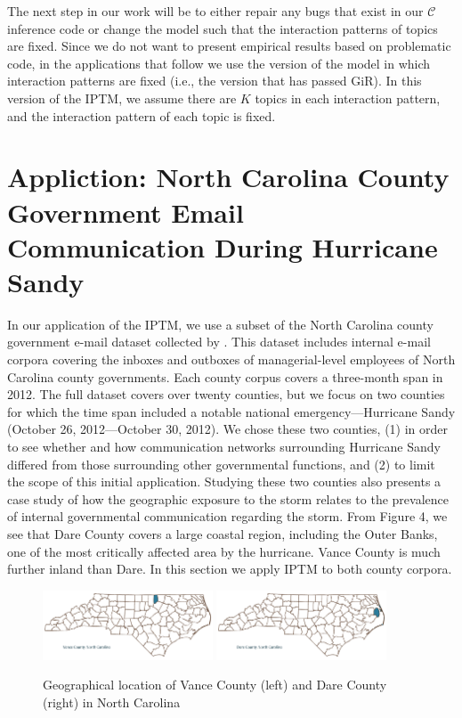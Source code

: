 \documentclass[a4paper]{article}
\begin{document}
The next step in our work will be to either repair any bugs that exist in our $\mathcal{C}$ inference code or change the model such that the interaction patterns of topics are fixed. Since we do not want to present empirical results based on problematic code, in the applications that follow we use the version of the model in which interaction patterns are fixed (i.e., the version that has passed GiR). In this version of the IPTM, we assume there are $K$ topics in each interaction pattern, and the interaction pattern of each topic is fixed.

\newpage
 \section{Appliction: North Carolina County Government Email \\ Communication During Hurricane Sandy}  \label{sec: Application to North Carolina email data}
In our application of the IPTM, we use a subset of the North Carolina county government e-mail dataset collected by \citet{ben2017transparency}. This dataset includes internal e-mail corpora covering the inboxes and outboxes of managerial-level employees of North Carolina county governments. Each county corpus covers a three-month span in 2012. The full dataset covers over twenty counties, but we focus on two counties for which the time span included a notable national emergency---Hurricane Sandy (October 26, 2012---October 30, 2012). We chose these two counties, (1) in order to see whether and how communication networks surrounding Hurricane Sandy differed from those surrounding other governmental functions, and (2) to limit the scope of this initial application. Studying these two counties also presents a case study of how the geographic exposure to the storm relates to the prevalence of internal governmental communication regarding the storm. From Figure 4, we see that Dare County covers a large coastal region, including the Outer Banks, one of the most critically affected area by the hurricane. Vance County is much further inland than Dare. In this section we apply IPTM to both county corpora.
  \begin{figure}[ht]
  	\centering
  	\includegraphics[width=0.45\textwidth]{plots/Vance.png} 
  	     	\includegraphics[width=0.45\textwidth]{plots/Dare.png} 
  	\label{fig:VanceDare}
  	\caption{Geographical location of Vance County (left) and Dare County (right) in North Carolina}
  \end{figure}
\end{document}
